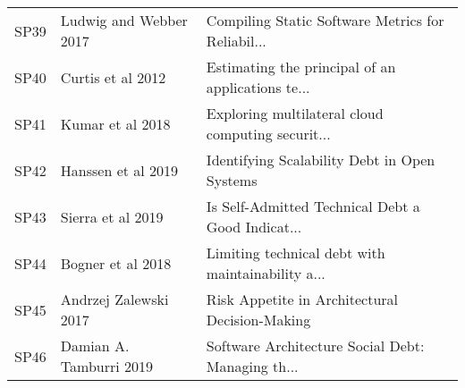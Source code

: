 \begin{tabular}{lll}
 SP39 &          Ludwig and Webber 2017 &  Compiling Static Software Metrics for Reliabil... \\
 SP40 &               Curtis et al 2012 &  Estimating the principal of an applications te... \\
 SP41 &                Kumar et al 2018 &  Exploring multilateral cloud computing securit... \\
 SP42 &              Hanssen et al 2019 &       Identifying Scalability Debt in Open Systems \\
 SP43 &               Sierra et al 2019 &  Is Self-Admitted Technical Debt a Good Indicat... \\
 SP44 &               Bogner et al 2018 &  Limiting technical debt with maintainability a... \\
 SP45 &           Andrzej Zalewski 2017 &     Risk Appetite in Architectural Decision-Making \\
 SP46 &         Damian A. Tamburri 2019 &  Software Architecture Social Debt: Managing th... \\
\bottomrule
\end{tabular}
